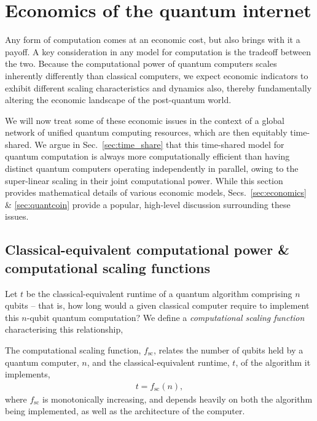 %
%

\section{Economics of the quantum internet} 

Any form of computation comes at an economic cost, but also brings with it a payoff. A key consideration in any model for computation is the tradeoff between the two. Because the computational power of quantum computers scales inherently differently than classical computers, we expect economic indicators to exhibit different scaling characteristics and dynamics also, thereby fundamentally altering the economic landscape of the post-quantum world.

We will now treat some of these economic issues in the context of a global network of unified quantum computing resources, which are then equitably time-shared. We argue in Sec.~\ref{sec:time_share} that this time-shared model for quantum computation is always more computationally efficient than having distinct quantum computers operating independently in parallel, owing to the super-linear scaling in their joint computational power. While this section provides mathematical details of various economic models, Secs.~\ref{sec:economics} \& \ref{sec:quantcoin} provide a popular, high-level discussion surrounding these issues.

%
%

\subsection{Classical-equivalent computational power \& computational scaling functions}

Let $t$ be the classical-equivalent runtime of a quantum algorithm comprising $n$ qubits -- that is, how long would a given classical computer require to implement this $n$-qubit quantum computation? We define a \textit{computational scaling function} characterising this relationship,

\begin{definition} \label{def:scaling_func} 
The computational scaling function, $f_\text{sc}$, relates the number of qubits held by a quantum computer, $n$, and the classical-equivalent runtime, $t$, of the algorithm it implements,
\begin{align}
t = f_\text{sc}(n),
\end{align}
	where $f_\text{sc}$ is monotonically increasing, and depends heavily on both the algorithm being implemented, as well as the architecture of the computer.
\end{definition}

